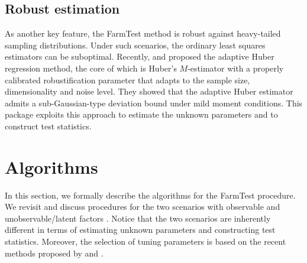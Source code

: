 



\subsection{Robust estimation}



As another key feature, the FarmTest method is robust against heavy-tailed sampling distributions. Under such scenarios, the ordinary least squares estimators can be suboptimal.
Recently, \cite{FLW2017} and \cite{SZF2020} proposed the adaptive Huber regression method, the core of which is Huber's $M$-estimator \citep{huber1} with a properly calibrated robustification parameter that adapts to the sample size, dimensionality and noise level. They showed that the adaptive Huber estimator admits a sub-Gaussian-type deviation bound under mild moment conditions.
This package exploits this approach to estimate the unknown parameters and to construct test statistics.  

 




\section[Algorithms]{Algorithms}\label{sec:algorithm}
In this section, we formally describe the algorithms for the FarmTest procedure.
We revisit and discuss procedures for the two scenarios with observable and unobservable/latent factors \citep{ZBFL2017, FKSZ2017}. Notice that the two scenarios are inherently different in terms of estimating unknown parameters and constructing test statistics.
Moreover, the selection of tuning parameters is based on the recent methods proposed by \cite{KMRSZ2019} and \cite{WZZZ2020}.




